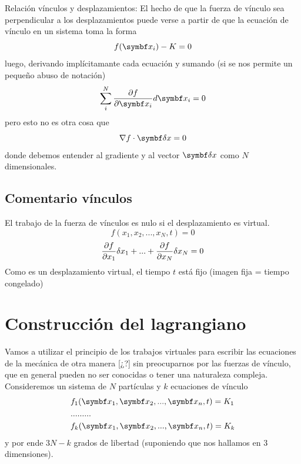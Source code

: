 \documentclass[10pt,oneside]{CBFT_book}
\begin{document}
\begin{notas}{Relación vínculos y desplazamientos:}
El hecho de que la fuerza de vínculo sea perpendicular a los desplazamientos puede
verse a partir de que la ecuación de vínculo en un sistema toma la forma
\[
	f(\vb{x}_i) - K = 0 
\]
luego, derivando implícitamante cada ecuación y sumando (si se nos permite un pequeño
abuso de notación)
\[
	\sum_i^N \dpar{f}{\vb{x}_i} d\vb{x}_i = 0 
\]
pero esto no es otra cosa que
\[
	\nabla f \cdot \vb{\delta x} = 0
\]
donde debemos entender al gradiente y al vector $\vb{\delta x}$ como $N$ dimensionales.
\end{notas}


\subsection{Comentario vínculos}
El trabajo de la fuerza de vínculos es nulo si el desplazamiento es virtual.
\[
	f(x_1,x_2,...,x_N,t) = 0
\]
\[
	\frac{\partial^{\hspace{-0.05em}} {f}}{\partial {x_1}^{\hspace{-0.05em}}}\delta x_1 + ... +  \frac{\partial^{\hspace{-0.05em}} {f}}{\partial {x_N}^{\hspace{-0.05em}}}\delta x_N = 0
\]
Como es un desplazamiento virtual, el tiempo $t$ está fijo (imagen fija = tiempo congelado)


\section{Construcción del lagrangiano}

Vamos a utilizar el principio de los trabajos virtuales para escribir las ecuaciones de la mecánica
de otra manera [¿?] sin preocuparnos por las fuerzas de vínculo, que en general pueden no ser 
conocidas o tener una naturaleza compleja.
Consideremos un sistema de $N$ partículas y $k$ ecuaciones de vínculo 
\begin{eqnarray*}
	& f_1(\vb{x}_1, \vb{x}_2,...,\vb{x}_n,t) = K_1  \\ 
	& ... ... ... \\
	& f_k(\vb{x}_1, \vb{x}_2,...,\vb{x}_n,t) = K_k 
\end{eqnarray*}
y por ende $3N-k$ grados de libertad (suponiendo que nos hallamos en 3 dimensiones).
\end{document}
